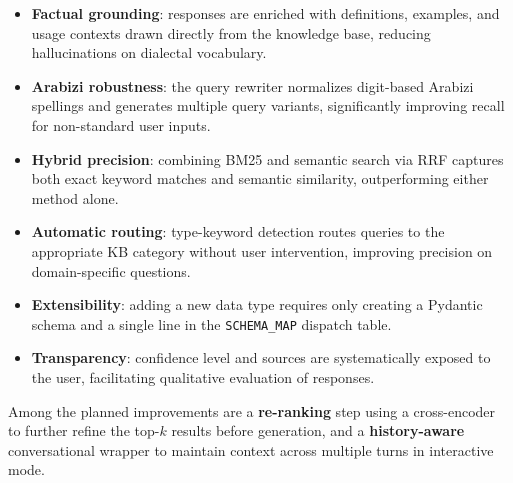 \begin{itemize}
    \item \textbf{Factual grounding}: responses are enriched with definitions,
    examples, and usage contexts drawn directly from the knowledge base, reducing
    hallucinations on dialectal vocabulary.

    \item \textbf{Arabizi robustness}: the query rewriter normalizes digit-based
    Arabizi spellings and generates multiple query variants, significantly improving
    recall for non-standard user inputs.

    \item \textbf{Hybrid precision}: combining BM25 and semantic search via RRF
    captures both exact keyword matches and semantic similarity, outperforming
    either method alone.

    \item \textbf{Automatic routing}: type-keyword detection routes queries to the
    appropriate KB category without user intervention, improving precision on
    domain-specific questions.

    \item \textbf{Extensibility}: adding a new data type requires only creating a
    Pydantic schema and a single line in the \texttt{SCHEMA\_MAP} dispatch table.

    \item \textbf{Transparency}: confidence level and sources are systematically
    exposed to the user, facilitating qualitative evaluation of responses.
\end{itemize}

Among the planned improvements are a \textbf{re-ranking} step using a cross-encoder
to further refine the top-$k$ results before generation, and a
\textbf{history-aware} conversational wrapper to maintain context across multiple
turns in interactive mode.
